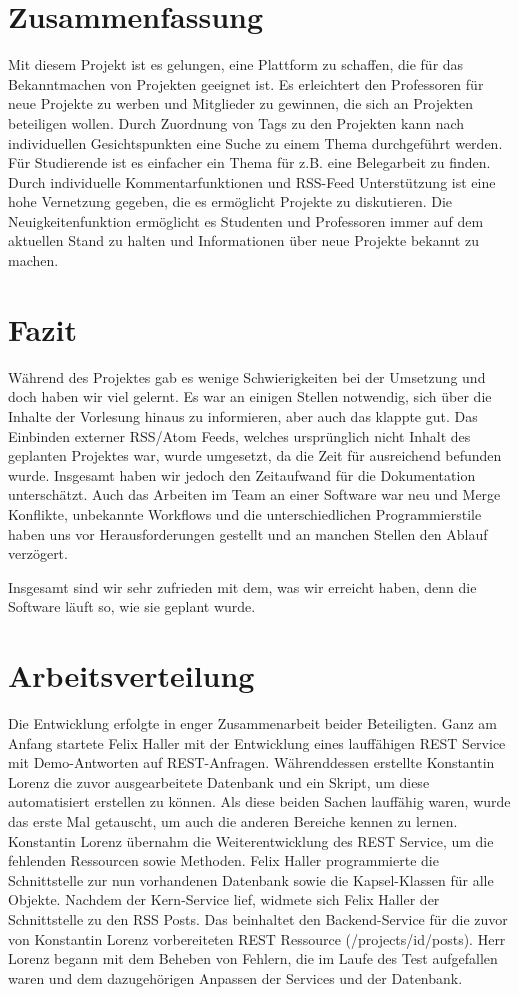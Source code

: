 \documentclass[12pt]{scrartcl}
\begin{document}
	\section{Zusammenfassung}
		Mit diesem Projekt ist es gelungen, eine Plattform zu schaffen, die für das Bekanntmachen von Projekten geeignet ist. Es erleichtert den Professoren für neue Projekte zu werben und Mitglieder zu gewinnen, die sich an Projekten beteiligen wollen. Durch Zuordnung von Tags zu den Projekten kann nach individuellen Gesichtspunkten eine Suche zu einem Thema durchgeführt werden. Für Studierende ist es einfacher ein Thema für z.B. eine Belegarbeit zu finden. Durch individuelle Kommentarfunktionen und RSS-Feed Unterstützung ist eine hohe Vernetzung gegeben, die es ermöglicht Projekte zu diskutieren. Die Neuigkeitenfunktion ermöglicht es Studenten und Professoren immer auf dem aktuellen Stand zu halten und Informationen über neue Projekte bekannt zu machen.
		
	\section{Fazit}
		Während des Projektes gab es wenige Schwierigkeiten bei der Umsetzung und doch haben wir viel gelernt. Es war an einigen Stellen notwendig, sich über die Inhalte der Vorlesung hinaus zu informieren, aber auch das klappte gut. Das Einbinden externer RSS/Atom Feeds, welches ursprünglich nicht Inhalt des geplanten Projektes war, wurde umgesetzt, da die Zeit für ausreichend befunden wurde. Insgesamt haben wir jedoch den Zeitaufwand für die Dokumentation unterschätzt. Auch das Arbeiten im Team an einer Software war neu und Merge Konflikte, unbekannte Workflows und die unterschiedlichen Programmierstile haben uns vor Herausforderungen gestellt und an manchen Stellen den Ablauf verzögert.
		
		Insgesamt sind wir sehr zufrieden mit dem, was wir erreicht haben, denn die Software läuft so, wie sie geplant wurde.
		
	\section{Arbeitsverteilung}
		
		Die Entwicklung erfolgte in enger Zusammenarbeit beider Beteiligten. Ganz am Anfang startete Felix Haller mit der Entwicklung eines lauffähigen REST Service mit Demo-Antworten auf REST-Anfragen. Währenddessen erstellte Konstantin Lorenz die zuvor ausgearbeitete Datenbank und ein Skript, um diese automatisiert erstellen zu können. Als diese beiden Sachen lauffähig waren, wurde das erste Mal getauscht, um auch die anderen Bereiche kennen zu lernen. Konstantin Lorenz übernahm die Weiterentwicklung des REST Service, um die fehlenden Ressourcen sowie Methoden. Felix Haller programmierte die Schnittstelle zur nun vorhandenen Datenbank sowie die Kapsel-Klassen für alle Objekte.
		Nachdem der Kern-Service lief, widmete sich Felix Haller der Schnittstelle zu den RSS Posts. Das beinhaltet den Backend-Service für die zuvor von Konstantin Lorenz vorbereiteten REST Ressource (/projects/{id}/posts). Herr Lorenz begann mit dem Beheben von Fehlern, die im Laufe des Test aufgefallen waren und dem dazugehörigen Anpassen der Services und der Datenbank.
		
\end{document}
